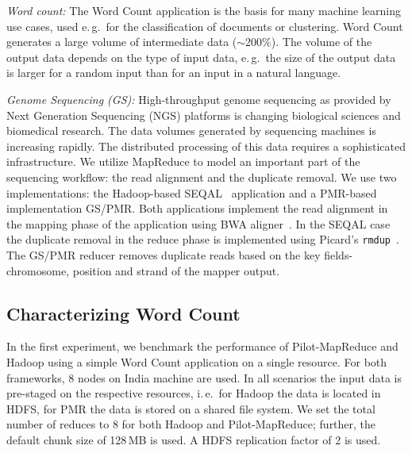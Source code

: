 \documentclass{sig-alternate}
\newcommand{\upp}{\vspace*{-0.5em}}
\newcommand{\pilotmapreduce}{Pilot-MapReduce\xspace}
\begin{document}
{\it Word count:} The Word Count application is the basis for many machine
learning use cases, used e.\,g.\ for the classification of documents or
clustering. Word Count generates a large volume of intermediate data
($\sim$200$\%$). The volume of the output data depends on the type of input
data, e.\,g.\ the size of the output data is larger for a random input than for
an input in a natural language.


{\it Genome Sequencing (GS):} High-throughput genome sequencing as
provided by Next Generation Sequencing (NGS) platforms is changing biological
sciences and biomedical research. The data volumes generated by sequencing
machines is increasing rapidly. The distributed processing of this data requires
a sophisticated infrastructure. We utilize MapReduce to model
an important part of the sequencing workflow: the read alignment and the
duplicate removal. We use two implementations: the Hadoop-based
SEQAL~\cite{seal-2011} application and a PMR-based implementation 
GS/PMR. Both applications implement the read alignment in the mapping phase of
the application using BWA aligner~\cite{Li:2010:FAL:1741823.1741825}. In the
SEQAL case the duplicate removal in the reduce phase is implemented using
Picard's \texttt{rmdup}~\cite{picard}. 
The GS/PMR reducer removes duplicate reads based on the key
fields-chromosome, position and strand of the mapper output.


\subsection{Characterizing Word Count}


In the first experiment, we benchmark the performance of
\pilotmapreduce and Hadoop using a simple Word Count application on a
single resource. For both frameworks, 8 nodes on India machine are
used. In all scenarios the input data is pre-staged on the respective
resources, i.\,e.\ for Hadoop the data is located in HDFS, for PMR the
data is stored on a shared file system. We set the total number of
reduces to 8 for both Hadoop and \pilotmapreduce; further, the default
chunk size of 128\,MB is used. A HDFS replication factor of 2 is used.
\end{document}
